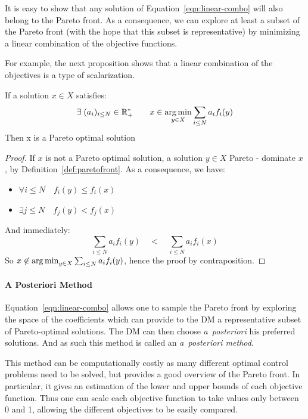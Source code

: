 It is easy to show that any solution of Equation~\eqref{eqn:linear-combo} will also belong to the Pareto front. As a consequence, we can explore at least a subset of the Pareto front (with the hope that this subset is representative) by minimizing a linear combination of the objective functions.


For example, the next proposition shows that a linear combination of the objectives is a type of scalarization.
\begin{proposition}
\label{prop:scalarization}
	If a solution $x \in X$ satisfies: 
	\begin{equation}\label{eq:linear_combination}
		\exists \; (a_i)_{i\leq N} \in \mathbb{R}_{+}^*\qquad x \in \operatorname*{arg\,min}_{y \in X} \sum_{i \leq N} a_i f_i(y)
	\end{equation}
	Then x is a Pareto optimal solution
\end{proposition}
\begin{proof}
	If $x$ is not a Pareto optimal solution, a solution $y \in X$  Pareto - dominate $x$, by Definition~\ref{def:paretofront}. As a consequence, we have:
	\begin{itemize}
			\item $\forall i \leq N \quad f_i(y) \leq f_i(x)$
			\item $\exists j \leq N \quad f_j(y) < f_j(x)$
	\end{itemize}
	And immediately:
	\begin{equation*}
		\sum_{i \leq N} a_i f_i(y) \quad < \quad \sum_{i \leq N} a_i f_i(x)
	\end{equation*}
	So $x \not \in \operatorname*{arg\,min}_{y \in X} \sum_{i \leq N} a_i f_i(y)$, hence the proof by contraposition.
\end{proof}

			\paragraph{A Posteriori Method}
				Equation~\eqref{eqn:linear-combo} allows one to sample the Pareto front by exploring the space of the coefficients which can provide to the DM a representative subset of Pareto-optimal solutions. The DM can then choose {\it a~posteriori} his preferred solutions. And as such this method is called an \emph{a~posteriori method}.

				This method can be computationally costly as many different optimal control problems need to be solved, but provides a good overview of the Pareto front. In particular, it gives an estimation of the lower and upper bounds of each objective function. Thus one can scale each objective function to take values only between 0 and 1, allowing the different objectives to be easily compared.
